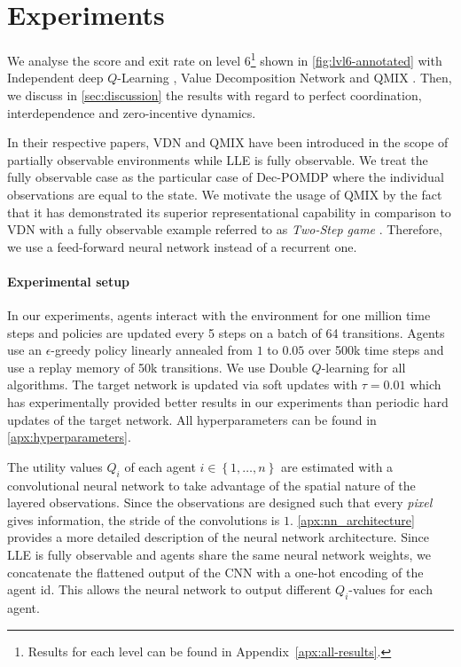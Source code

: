 
\section{Experiments}
\label{sec:experients}

We analyse the score and exit rate on level 6\footnote{Results for each level can be found in Appendix~\ref{apx:all-results}.} shown in \autoref{fig:lvl6-annotated} with Independent deep $Q$-Learning \citep[IQL]{dqn_mnih_2015}, Value Decomposition Network \citep[VDN]{vdn_sunehag_value-decomposition_2018} and QMIX \citep{rashid_qmix_2018}. Then, we discuss in \autoref{sec:discussion} the results with regard to  perfect coordination, interdependence and zero-incentive dynamics.

In their respective papers, VDN and QMIX have been introduced in the scope of partially observable environments while LLE is fully observable. We treat the fully observable case as the particular case of Dec-POMDP where the individual observations are equal to the state. We motivate the usage of QMIX by the fact that it has demonstrated its superior representational capability in comparison to VDN with a fully observable example referred to as \textit{Two-Step game} \citep{rashid_qmix_2018}. Therefore, we use a feed-forward neural network instead of a recurrent one.


\paragraph{Experimental setup} In our experiments, agents interact with the environment for one million time steps and policies are updated every 5 steps on a batch of 64 transitions. Agents use an $\epsilon$-greedy policy linearly annealed from $1$ to $0.05$ over 500k time steps and use a replay memory of 50k transitions. We use Double $Q$-learning for all algorithms. The target network is updated via soft updates with $\tau=0.01$ \citep{ddpg_2016} which has experimentally provided better results in our experiments than periodic hard updates of the target network. All hyperparameters can be found in \autoref{apx:hyperparameters}.

The utility values $Q_i$ of each agent $i \in \left\{1, \dots, n\right\}$ are estimated with a convolutional neural network \citep{lecun_gradient-based_1998_cnn} to take advantage of the spatial nature of the layered observations. Since the observations are designed such that every \textit{pixel} gives information, the stride of the convolutions is $1$. \autoref{apx:nn_architecture} provides a more detailed description of the neural network architecture. Since LLE is fully observable and agents share the same neural network weights, we concatenate the flattened output of the CNN with a one-hot encoding of the agent id. This allows the neural network to output different $Q_i$-values for each agent.

